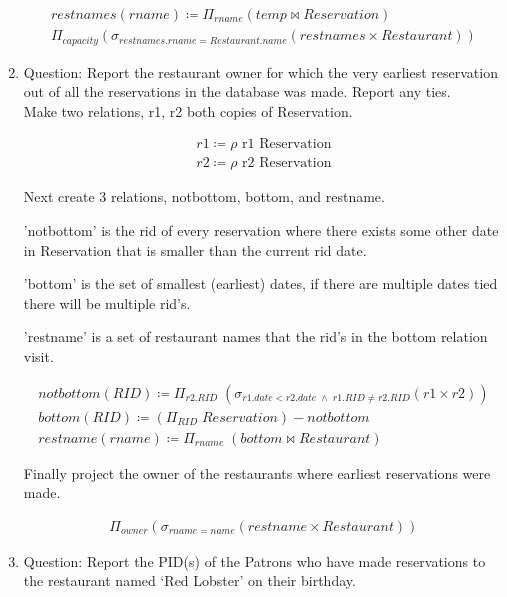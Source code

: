 \documentclass{article}
\begin{document}
\begin{enumerate}
	\begin{align}
         restnames(rname) \coloneqq \Pi_{rname} (temp \bowtie Reservation)\\
         \Pi_{capacity} (\sigma_{restnames.rname = Restaurant.name} (restnames \times Restaurant))
		\end{align} 
	
\item%
Question: Report the restaurant owner for which the very earliest reservation out of all the reservations in the
database was made. Report any ties.\\

Make two relations, r1, r2 both copies of Reservation. 

 		\begin{align}
        r1 \coloneqq \rho \text{  r1 Reservation}  \\
        r2 \coloneqq \rho \text{  r2 Reservation}
		\end{align}
	
Next create 3 relations, notbottom, bottom, and restname.

'notbottom' is the rid of every reservation where there exists some other date in Reservation that is smaller than the current rid date.

'bottom' is the set of smallest (earliest) dates, if there are multiple dates tied there will be multiple rid's.

'restname' is a set of restaurant names that the rid's in the bottom relation visit.

		\begin{align}
         notbottom(RID) \coloneqq \Pi_{r2.RID} \; (\sigma_{r1.date < r2.date \; \wedge  \; r1.RID \neq r2.RID} (r1 \times r2))\\
         bottom(RID)\coloneqq (\Pi_{RID} \; Reservation) - notbottom\\
         restname(rname) \coloneqq \Pi_{rname} \;(bottom \bowtie Restaurant)
		\end{align} 
		
		Finally project the owner of the restaurants where earliest reservations were made. 


		\begin{align}
        \Pi_{owner} (\sigma_{rname=name} (restname \times Restaurant))
		\end{align} 

\item%
Question: Report the PID(s) of the Patrons who have made reservations to the restaurant named ‘Red Lobster’
on their birthday.\\


\end{enumerate}
\end{document}
